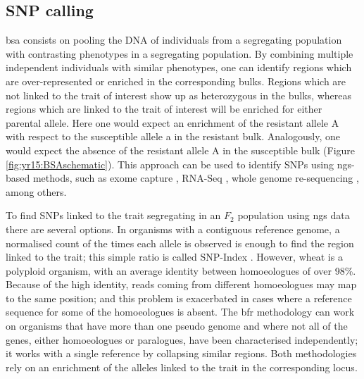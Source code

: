 \subsection{SNP calling}
\gls{bsa} consists on pooling the DNA of individuals from a segregating population with contrasting phenotypes \citep{Michelmore1991} in a segregating population. 
By combining multiple independent individuals with similar phenotypes, one can identify regions which are over-represented or enriched in the corresponding bulks. 
Regions which are not linked to the trait of interest show up as heterozygous in the bulks, whereas regions which are linked to the trait of interest will be enriched for either parental allele.
Here one would expect an enrichment of the resistant allele A with respect to the susceptible allele a in the resistant bulk. 
Analogously, one would expect the absence of the resistant allele A in the susceptible bulk (Figure \ref{fig:yr15:BSAschematic}). 
This approach can be used to identify SNPs using \gls{ngs}-based methods, such as exome capture \citep{Hodges2007}, RNA-Seq \citep{Pickrell2010}, whole genome re-sequencing \citep{Schneeberger2009}, among others. 

To find SNPs linked to the trait segregating in an $F_{2}$ population using \gls{ngs} data there are several options. 
In organisms with a contiguous reference genome, a normalised count of the times each allele is observed is enough to find the region linked to the trait; this simple ratio is called SNP-Index \citep{Takagi2013a}.
However, wheat is a polyploid organism, with an average identity between homoeologues of over 98\%. 
Because of the high identity, reads coming from different homoeologues may map to the same position; and this problem is exacerbated in cases where a reference sequence for some of the homoeologues is absent. 
The \gls{bfr} \citep{Trick2012} methodology can work on organisms that have more than one pseudo genome and where not all of the genes, either homoeologues or paralogues, have been characterised independently; it works with a single reference by collapsing similar regions. 
Both methodologies rely on an enrichment of the alleles linked to the trait in the corresponding locus. 

